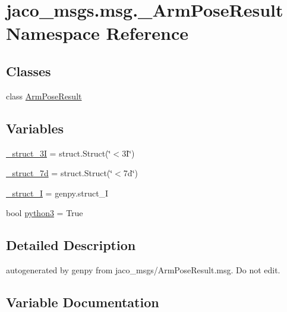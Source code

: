 \hypertarget{namespacejaco__msgs_1_1msg_1_1__ArmPoseResult}{}\section{jaco\+\_\+msgs.\+msg.\+\_\+\+Arm\+Pose\+Result Namespace Reference}
\label{namespacejaco__msgs_1_1msg_1_1__ArmPoseResult}
\subsection*{Classes}
\begin{DoxyCompactItemize}
\item 
class \hyperlink{classjaco__msgs_1_1msg_1_1__ArmPoseResult_1_1ArmPoseResult}{Arm\+Pose\+Result}
\end{DoxyCompactItemize}
\subsection*{Variables}
\begin{DoxyCompactItemize}
\item 
\hyperlink{namespacejaco__msgs_1_1msg_1_1__ArmPoseResult_a9bfa1b7c53beb03a2ecfc00157110816}{\+\_\+struct\+\_\+3I} = struct.\+Struct(\char`\"{}$<$3\+I\char`\"{})
\item 
\hyperlink{namespacejaco__msgs_1_1msg_1_1__ArmPoseResult_a99dcf874612f38f9141b40b564add612}{\+\_\+struct\+\_\+7d} = struct.\+Struct(\char`\"{}$<$7d\char`\"{})
\item 
\hyperlink{namespacejaco__msgs_1_1msg_1_1__ArmPoseResult_afea04cee05e4acd11ef6f03501af23a3}{\+\_\+struct\+\_\+I} = genpy.\+struct\+\_\+I
\item 
bool \hyperlink{namespacejaco__msgs_1_1msg_1_1__ArmPoseResult_a24caf717852f7d21f4d8076263c067a8}{python3} = True
\end{DoxyCompactItemize}


\subsection{Detailed Description}
\begin{DoxyVerb}autogenerated by genpy from jaco_msgs/ArmPoseResult.msg. Do not edit.\end{DoxyVerb}
 

\subsection{Variable Documentation}
